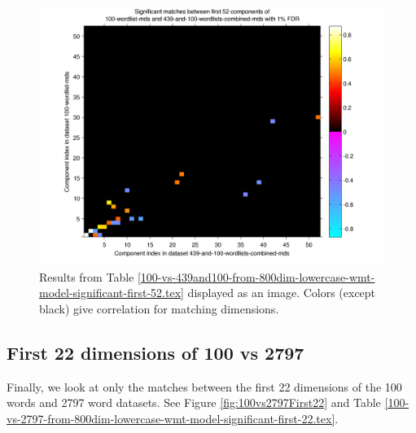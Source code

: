 \documentclass[10pt,letterpaper]{book}
\begin{document}


\begin{figure}[!tbp]
    \includegraphics[width=0.9\linewidth]{100-vs-439and100-from-800dim-lowercase-wmt-model-significant-first-52}
    \caption{Results from Table 
    \ref{100-vs-439and100-from-800dim-lowercase-wmt-model-significant-first-52.tex} 
    displayed as an image. Colors (except black) give correlation for matching 
    dimensions.}
    \label{fig:100vs439And100First52}
\end{figure}

\subsection{First 22 dimensions of 100 vs 2797}

Finally, we look at only the matches between the first 22 dimensions of the
100 words and 2797 word datasets. See Figure \ref{fig:100vs2797First22} and
Table 
\ref{100-vs-2797-from-800dim-lowercase-wmt-model-significant-first-22.tex}.



\end{document}
